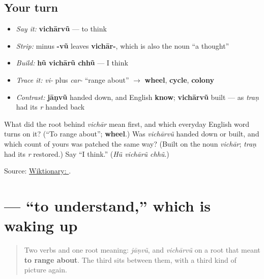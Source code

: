 \subsection*{Your turn}
\begin{itemize}
\raggedright
  \item \emph{Say it:} \textbf{vichārvũ} — to think
  \item \emph{Strip:} minus \textbf{-vũ} leaves \textbf{vichār-}, which is also the noun \textquotedblleft{}a thought\textquotedblright{}
  \item \emph{Build:} \textbf{hũ vichārũ chhũ} — I think
  \item \emph{Trace it:} \emph{vi-} plus \emph{car-} \textquotedblleft{}range about\textquotedblright{} $\to$ \textbf{wheel}, \textbf{cycle}, \textbf{colony}
  \item \emph{Contrast:} \textbf{jāṇvũ} handed down, and English \textbf{know}; \textbf{vichārvũ} built — as \emph{traṇ} had its \emph{r} handed back
\end{itemize}

\begin{tcolorbox}[breakable,colback=teal!4,colframe=teal!35!black,title={Before you move on}]
What did the root behind \emph{vichār} mean first, and which everyday English word turns on it? (\textquotedblleft{}To range about\textquotedblright{}; \textbf{wheel}.) Was \emph{vichārvũ} handed down or built, and which count of yours was patched the same way? (Built on the noun \emph{vichār}; \emph{traṇ} had its \emph{r} restored.) Say \textquotedblleft{}I think.\textquotedblright{} (\emph{Hũ vichārũ chhũ}.)

Source: \href{https://en.wiktionary.org/wiki/\%E0\%AA\%B5\%E0\%AA\%BF\%E0\%AA\%9A\%E0\%AA\%BE\%E0\%AA\%B0\%E0\%AA\%B5\%E0\%AB\%81\%E0\%AA\%82}{Wiktionary: }.
\end{tcolorbox}
\section[\texorpdfstring{\gu{સમજવું} (samajvũ)}{સમજવું (samajvũ)}]{ — \textquotedblleft{}to understand,\textquotedblright{} which is waking up}

\label{lesson:GU-C08-samajvun}



\begin{quote}
Two verbs and one root meaning: \emph{jāṇvũ}, and \emph{vichārvũ} on a root that meant \textbf{to range about}. The third sits between them, with a third kind of picture again.
\end{quote}

